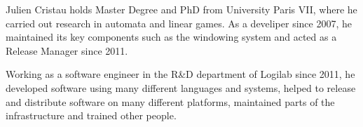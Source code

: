 \begin{participant}[type=PI,PM=10]{Julien Cristau}
  holds Master Degree and PhD from University Paris VII, where he carried out
  research in automata and linear games. As a  develiper since 2007, he
  maintained its key components such as the  windowing system and
  acted as a  Release Manager since 2011.
  
  Working as a software engineer in the R\&D department of Logilab since
  2011, he developed software using many different languages and systems,
  helped to release and distribute software on many different platforms,
  maintained parts of the infrastructure and trained other people.
\end{participant}

